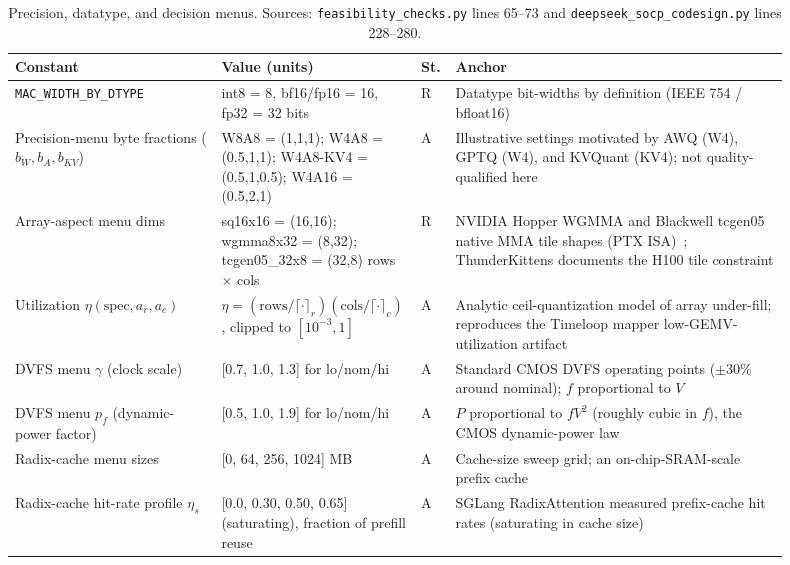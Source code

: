 \begin{table}[!htb]
\centering
\caption{Precision, datatype, and decision menus. Sources: \texttt{feasibility\_\allowbreak checks.py} lines 65--73 and \texttt{deepseek\_\allowbreak socp\_\allowbreak codesign.py} lines 228--280.}
\label{tab:coeff_menus}
\footnotesize\setlength{\tabcolsep}{3pt}
\begin{tabular}{@{}p{0.26\linewidth}p{0.17\linewidth}p{0.045\linewidth}p{0.42\linewidth}@{}}
\toprule
Constant & Value (units) & St. & Anchor \\
\midrule
\texttt{MAC\_\allowbreak WIDTH\_\allowbreak BY\_\allowbreak DTYPE} & int8 = 8, bf16/fp16 = 16, fp32 = 32 bits & R & Datatype bit-widths by definition (IEEE 754 / bfloat16)~\citep{ieee754_2019,kalamkar2019bfloat16} \\
Precision-menu byte fractions ($b_W, b_A, b_{KV}$) & W8A8 = (1,1,1); W4A8 = (0.5,1,1); W4A8-KV4 = (0.5,1,0.5); W4A16 = (0.5,2,1) & A & Illustrative settings motivated by AWQ (W4), GPTQ (W4), and KVQuant (KV4); not quality-qualified here \citep{lin2024awq, frantar2023gptq, hooper2024kvquant} \\
Array-aspect menu dims & sq16x16 = (16,16); wgmma8x32 = (8,32); tcgen05\_\allowbreak 32x8 = (32,8) rows $\times$ cols & R & NVIDIA Hopper WGMMA and Blackwell tcgen05 native MMA tile shapes (PTX ISA)~\citep{nvidia_ptx_isa}; ThunderKittens documents the H100 tile constraint \citep{spector2024thunderkittens} \\
Utilization $\eta(\mathrm{spec}, a_r, a_c)$ & $\eta = (\mathrm{rows}/\lceil\cdot\rceil_r)\allowbreak (\mathrm{cols}/\lceil\cdot\rceil_c)$, clipped to $[10^{-3}, 1]$ & A & Analytic ceil-quantization model of array under-fill; reproduces the Timeloop mapper low-GEMV-utilization artifact \citep{timeloop} \\
DVFS menu $\gamma$ (clock scale) & [0.7, 1.0, 1.3] for lo/nom/hi & A & Standard CMOS DVFS operating points ($\pm$30\% around nominal); $f$ proportional to $V$~\citep{weste2011cmos} \\
DVFS menu $p_f$ (dynamic-power factor) & [0.5, 1.0, 1.9] for lo/nom/hi & A & $P$ proportional to $f V^2$ (roughly cubic in $f$), the CMOS dynamic-power law~\citep{weste2011cmos} \\
Radix-cache menu sizes & [0, 64, 256, 1024] MB & A & Cache-size sweep grid; an on-chip-SRAM-scale prefix cache \citep{zheng2024sglang} \\
Radix-cache hit-rate profile $\eta_s$ & [0.0, 0.30, 0.50, 0.65] (saturating), fraction of prefill reuse & A & SGLang RadixAttention measured prefix-cache hit rates (saturating in cache size) \citep{zheng2024sglang} \\
\bottomrule
\end{tabular}

\end{table}

